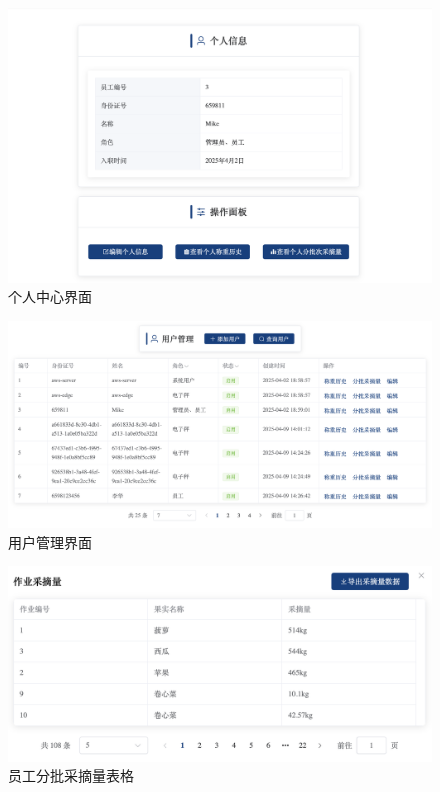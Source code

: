 \begin{figure}
    \centering
    \includegraphics[width=\linewidth]{../result/web-me.png}
    \caption{个人中心界面}
    \label{fig:web-me}
\end{figure}

\begin{figure}
    \centering
    \includegraphics[width=\linewidth]{../result/web-user.png}
    \caption{用户管理界面}
    \label{fig:web-user}
\end{figure}

\begin{figure}
    \centering
    \includegraphics[width=\linewidth]{../result/chart-user-works.png}
    \caption{员工分批采摘量表格}
    \label{fig:chart-user-works}
\end{figure}

